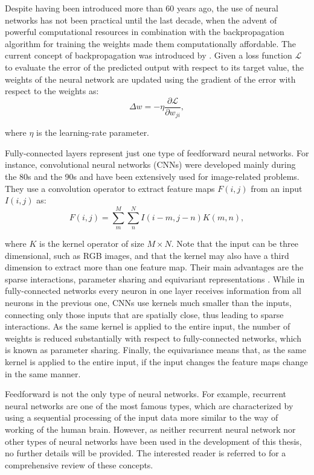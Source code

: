 Despite having been introduced more than 60 years ago, the use of neural networks has not been practical until the last decade, when the advent of powerful computational resources in combination with the backpropagation algorithm for training the weights made them computationally affordable.
The current concept of backpropagation was introduced by \citet{rumelhart1986learning}.
Given a loss function $\mathcal{L}$ to evaluate the error of the predicted output with respect to its target value, the weights of the neural network are updated using the gradient of the error with respect to the weights as:
\begin{equation}
  \Delta w=-\eta \frac{\partial \mathcal{L}}{\partial w_{ji}}
  \label{ch4:eq4},
\end{equation}

\noindent where $\eta$ is the learning-rate parameter.

Fully-connected layers represent just one type of feedforward neural networks.
For instance, convolutional neural networks (CNNs) were developed mainly during the 80s and the 90s \citep{fukushima1980neocognitron,fukushima1988neocognitron,lecun1989backpropagation,lecun1998gradient} and have been extensively used for image-related problems.
They use a convolution operator to extract feature maps $F(i,j)$ from an input $I(i,j)$ as:
\begin{equation}
  F(i,j)=\sum^M_m\sum^N_nI(i-m,j-n)K(m,n),
  \label{ch4:eq5}
\end{equation}

\noindent where $K$ is the kernel operator of size $M\times N$.
Note that the input can be three dimensional, such as RGB images, and that the kernel may also have a third dimension to extract more than one feature map.
Their main advantages are the sparse interactions, parameter sharing and equivariant representations \citep{goodfellow2016deep}.
While in fully-connected networks every neuron in one layer receives information from all neurons in the previous one, CNNs use kernels much smaller than the inputs, connecting only those inputs that are spatially close, thus leading to sparse interactions.
As the same kernel is applied to the entire input, the number of weights is reduced substantially with respect to fully-connected networks, which is known as parameter sharing.
Finally, the equivariance means that, as the same kernel is applied to the entire input, if the input changes the feature maps change in the same manner.

Feedforward is not the only type of neural networks. For example, recurrent neural networks are one of the most famous types, which are characterized by using a sequential processing of the input data more similar to the way of working of the human brain.
However, as neither recurrent neural network nor other types of neural networks have been used in the development of this thesis, no further details will be provided.
The interested reader is referred to \citet{goodfellow2016deep} for a comprehensive review of these concepts.

